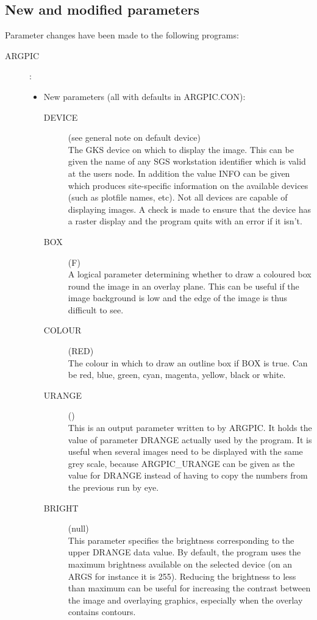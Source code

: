\subsection{New and modified parameters}
Parameter changes have been made to the following programs:
\begin{description}

\item [ARGPIC]:

\begin{itemize}
\item New parameters (all with defaults in ARGPIC.CON):
\begin{description}
\item [DEVICE](see general note on default device)\\
 The GKS device on which to display the image.
 This can be given the name of any SGS workstation identifier which is valid at
 the users node.
 In addition the value INFO can be given which produces site-specific
 information on the available devices (such as plotfile names, etc). 
 Not all devices are capable of displaying images.
 A check is made to ensure that the device has a raster display and the program
 quits with an error if it isn't.
\item [BOX](F)\\
 A logical parameter determining whether to draw a coloured box round the image
 in an overlay plane.
 This can be useful if the image background is low and the edge of the image is
 thus difficult to see.
\item [COLOUR](RED)\\
 The colour in which to draw an outline box if BOX is true.
 Can be red, blue, green, cyan, magenta, yellow, black or white.
\item [URANGE]()\\
 This is an output parameter written to by ARGPIC.
 It holds the value of parameter DRANGE actually used by the program.
 It is useful when several images need to be displayed with the same grey scale,
 because ARGPIC\_URANGE can be given as the value for DRANGE instead of having
 to copy the numbers from the previous run by eye.
\item [BRIGHT](null)\\
 This parameter specifies the brightness corresponding to the upper DRANGE data
 value.
 By default, the program uses the maximum brightness available on the selected
 device (on an ARGS for instance it is 255).
 Reducing the brightness to less than maximum can be useful for increasing the
 contrast between the image and overlaying graphics, especially when the overlay
 contains contours.
\end{description}
\end{itemize}


\end{description}
